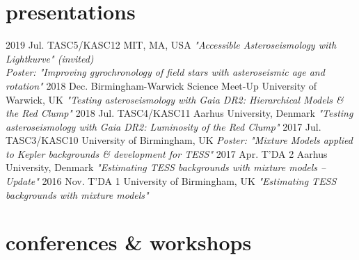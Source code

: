 \documentclass[]{k-cv} %
\begin{document}
\section{presentations}

\begin{entrylist}
\entry
{2019 Jul.}
{TASC5/KASC12}
{MIT, MA, USA}
{\emph{"Accessible Asteroseismology with Lightkurve" (invited)}\\ \emph{Poster: "Improving gyrochronology of field stars with asteroseismic age and rotation"}}
\entry
{2018 Dec.}
{Birmingham-Warwick Science Meet-Up}
{University of Warwick, UK}
{\emph{"Testing asteroseismology with \textit{Gaia} DR2: Hierarchical Models \& the Red Clump"}}
\entry
{2018 Jul.}
{TASC4/KASC11}
{Aarhus University, Denmark}
{\emph{"Testing asteroseismology with \textit{Gaia} DR2: Luminosity of the Red Clump"}}
\entry
{2017 Jul.}
{TASC3/KASC10}
{University of Birmingham, UK}
{\emph{Poster: "Mixture Models applied to \emph{Kepler} backgrounds \& development for TESS"}}
\entry
{2017 Apr.}
{T'DA 2}
{Aarhus University, Denmark}
{\emph{"Estimating TESS backgrounds with mixture models -- Update"}}
\entry
{2016 Nov.}
{T'DA 1}
{University of Birmingham, UK}
{\emph{"Estimating TESS backgrounds with mixture models"}}
\end{entrylist}

\section{conferences \& workshops}
\end{document}
